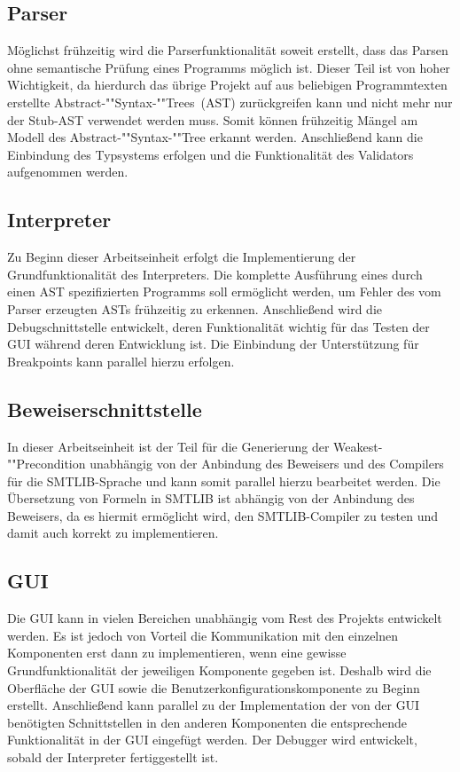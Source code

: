 \subsection{Parser}
Möglichst frühzeitig wird die Parserfunktionalität soweit erstellt, dass das Parsen ohne semantische Prüfung eines Programms möglich ist. Dieser Teil ist von hoher Wichtigkeit, da hierdurch das übrige Projekt auf aus beliebigen Programmtexten erstellte Abstract-""Syntax-""Trees~(AST) zurückgreifen kann und nicht mehr nur der Stub-AST verwendet werden muss. Somit können frühzeitig Mängel am Modell des Abstract-""Syntax-""Tree erkannt werden. Anschließend kann die Einbindung des Typsystems erfolgen und die Funktionalität des Validators aufgenommen werden.

\subsection{Interpreter}
Zu Beginn dieser Arbeitseinheit erfolgt die Implementierung der Grundfunktionalität des Interpreters. Die komplette Ausführung eines durch einen AST spezifizierten Programms soll ermöglicht werden, um Fehler des vom Parser erzeugten ASTs frühzeitig zu erkennen. Anschließend wird die Debugschnittstelle entwickelt, deren Funktionalität wichtig für das Testen der GUI während deren Entwicklung ist. Die Einbindung der Unterstützung für Breakpoints kann parallel hierzu erfolgen.

\subsection{Beweiserschnittstelle}
In dieser Arbeitseinheit ist der Teil für die Generierung der Weakest-""Precondition unabhängig von der Anbindung des Beweisers und des Compilers für die SMTLIB-Sprache und kann somit parallel hierzu bearbeitet werden. Die Übersetzung von Formeln in SMTLIB ist abhängig von der Anbindung des Beweisers, da es hiermit ermöglicht wird, den SMTLIB-Compiler zu testen und damit auch korrekt zu implementieren.

\subsection{GUI}
Die GUI kann in vielen Bereichen unabhängig vom Rest des Projekts entwickelt werden. Es ist jedoch von Vorteil die Kommunikation mit den einzelnen Komponenten erst dann zu implementieren, wenn eine gewisse Grundfunktionalität der jeweiligen Komponente gegeben ist. Deshalb wird die Oberfläche der GUI sowie die Benutzerkonfigurationskomponente zu Beginn erstellt. Anschließend kann parallel zu der Implementation der von der GUI benötigten Schnittstellen in den anderen Komponenten die entsprechende Funktionalität in der GUI eingefügt werden. Der Debugger wird entwickelt, sobald der Interpreter fertiggestellt ist.


